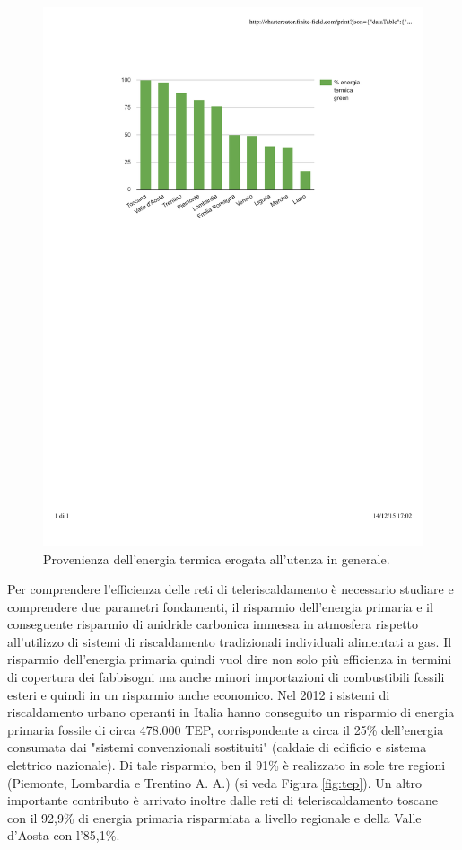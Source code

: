 \documentclass[laurea,oneside,11pt]{USiena_tesiLM3}
\begin{document}
\begin{figure}[!ht]
\centering
\includegraphics[width=\textwidth]{figure/energia_green} 
\caption{Provenienza dell'energia termica erogata all'utenza in generale.}
\label{fig:energia_green}
\end{figure}

Per comprendere l'efficienza delle reti di teleriscaldamento è necessario studiare e comprendere due parametri fondamenti, il risparmio dell'energia primaria e il conseguente risparmio di anidride carbonica immessa in atmosfera rispetto all'utilizzo di sistemi di riscaldamento tradizionali individuali alimentati a gas. Il risparmio dell'energia primaria quindi vuol dire non solo più efficienza in termini di copertura dei fabbisogni ma anche minori importazioni di combustibili fossili esteri e quindi in un risparmio anche economico. Nel 2012 i sistemi di riscaldamento urbano operanti in Italia hanno conseguito un risparmio di energia primaria fossile di circa 478.000 TEP, corrispondente a circa il 25\% dell'energia consumata dai "sistemi convenzionali sostituiti" (caldaie di edificio e sistema elettrico nazionale). Di tale risparmio, ben il 91\% è realizzato in sole tre regioni (Piemonte, Lombardia e Trentino A. A.) (si veda Figura \ref{fig:tep}). 
Un altro importante contributo è arrivato inoltre dalle reti di teleriscaldamento toscane con il 92,9\% di energia primaria risparmiata a livello regionale e della Valle d'Aosta con l'85,1\%.
\end{document}

